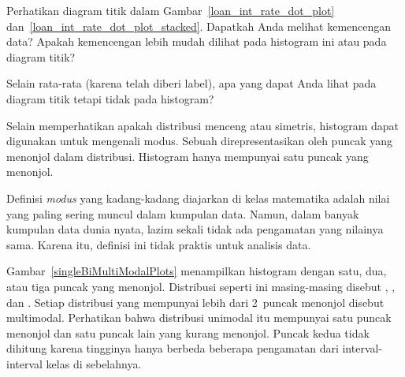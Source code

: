 
\begin{exercisewrap}
\begin{nexercise}
Perhatikan diagram titik dalam
Gambar~\ref{loan_int_rate_dot_plot}
dan~\ref{loan_int_rate_dot_plot_stacked}.
Dapatkah Anda melihat kemencengan data? Apakah kemencengan lebih
mudah dilihat pada histogram ini atau pada diagram titik?\footnotemark{}
\end{nexercise}
\end{exercisewrap}

\begin{exercisewrap}
\begin{nexercise}
Selain rata-rata (karena telah diberi label), apa yang dapat Anda
lihat pada diagram titik tetapi tidak pada histogram?\footnotemark{}
\end{nexercise}
\end{exercisewrap}

Selain memperhatikan apakah distribusi menceng atau simetris,
histogram dapat digunakan untuk mengenali modus.
Sebuah  direpresentasikan oleh puncak yang menonjol
dalam distribusi.
Histogram  hanya mempunyai satu puncak
yang menonjol.

Definisi \emph{modus} yang kadang-kadang diajarkan di kelas
matematika adalah nilai yang paling sering muncul dalam kumpulan
data. Namun, dalam banyak kumpulan data dunia nyata, lazim sekali
tidak ada pengamatan yang nilainya sama. Karena itu, definisi ini
tidak praktis untuk analisis data.

Gambar~\ref{singleBiMultiModalPlots} menampilkan histogram dengan
satu, dua, atau tiga puncak yang menonjol.
Distribusi seperti ini masing-masing disebut
, , dan .
Setiap distribusi yang mempunyai lebih dari 2~puncak menonjol
disebut multimodal.
Perhatikan bahwa distribusi unimodal itu mempunyai satu puncak
menonjol dan satu puncak lain yang kurang menonjol. Puncak kedua
tidak dihitung karena tingginya hanya berbeda beberapa pengamatan
dari interval-interval kelas di sebelahnya.

